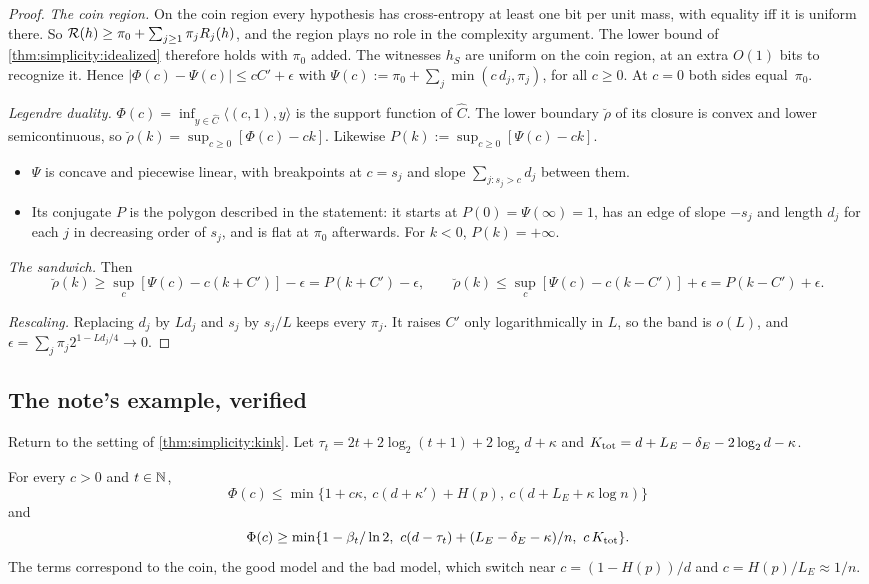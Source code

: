 \begin{proof}
\emph{The coin region.} On the coin region every hypothesis has cross-entropy at least one bit per unit mass, with equality iff it is uniform there. So $\mathcal R(h)\ge\pi_0+\sum_{j\ge1}\pi_jR_j(h)$, and the region plays no role in the complexity argument. The lower bound of \cref{thm:simplicity:idealized} therefore holds with $\pi_0$ added. The witnesses $h_S$ are uniform on the coin region, at an extra $O(1)$ bits to recognize it. Hence $|\Phi(c)-\Psi(c)|\le cC'+\epsilon$ with $\Psi(c):=\pi_0+\sum_j\min(c\,d_j,\pi_j)$, for all $c\ge0$. At $c=0$ both sides equal~$\pi_0$.

\emph{Legendre duality.} $\Phi(c)=\inf_{y\in\hat C}\langle(c,1),y\rangle$ is the support function of $\hat C$. The lower boundary $\breve\rho$ of its closure is convex and lower semicontinuous, so $\breve\rho(k)=\sup_{c\ge0}[\Phi(c)-ck]$. Likewise $P(k):=\sup_{c\ge0}[\Psi(c)-ck]$.
\begin{itemize}
\item $\Psi$ is concave and piecewise linear, with breakpoints at $c=s_j$ and slope $\sum_{j:s_j>c}d_j$ between them.
\item Its conjugate $P$ is the polygon described in the statement: it starts at $P(0)=\Psi(\infty)=1$, has an edge of slope $-s_j$ and length $d_j$ for each $j$ in decreasing order of $s_j$, and is flat at $\pi_0$ afterwards. For $k<0$, $P(k)=+\infty$.
\end{itemize}

\emph{The sandwich.} Then
\[
\breve\rho(k)\ge\sup_c[\Psi(c)-c(k+C')]-\epsilon=P(k+C')-\epsilon,\qquad\breve\rho(k)\le\sup_c[\Psi(c)-c(k-C')]+\epsilon=P(k-C')+\epsilon.
\]

\emph{Rescaling.} Replacing $d_j$ by $Ld_j$ and $s_j$ by $s_j/L$ keeps every $\pi_j$. It raises $C'$ only logarithmically in $L$, so the band is $o(L)$, and $\epsilon=\sum_j\pi_j2^{1-Ld_j/4}\to0$.
\end{proof}

\subsection{The note's example, verified}\label{app:simplicity:example}

Return to the setting of \cref{thm:simplicity:kink}. Let $\tau_t=2t+2\log_2(t+1)+2\log_2d+\kappa$ and $K_{\rm tot}=d+L_E-\delta_E-2\log_2d-\kappa$.

\begin{theorem}\label{thm:simplicity:example}
For every $c>0$ and $t\in\mathbb{N}$,
\[
\Phi(c)\le\min\{1+c\kappa,\ c(d+\kappa')+H(p),\ c(d+L_E+\kappa\log n)\}
\]
and
\[
\Phi(c)\ge\min\{1-\beta_t/\ln2,\ c(d-\tau_t)+(L_E-\delta_E-\kappa)/n,\ c\,K_{\rm tot}\}.
\]
The terms correspond to the coin, the good model and the bad model, which switch near $c=(1-H(p))/d$ and $c=H(p)/L_E\approx1/n$.
\end{theorem}

